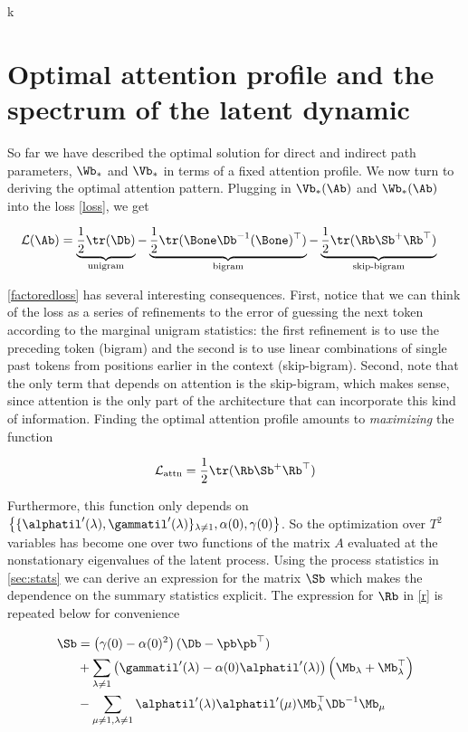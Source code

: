 k\documentclass{article}
\begin{document}
\section{Optimal attention profile and the spectrum of the latent dynamic}
So far we have described the optimal solution for direct and indirect path parameters, $\Wb_*$ and $\Vb_*$ in terms of a fixed attention profile. We now turn to deriving the optimal attention pattern. Plugging in $\Vb_*(\Ab)$ and $\Wb_*(\Ab)$ into the loss \eqref{loss}, we get 

\begin{align}\label{factoredloss}
    \mathcal{L}(\Ab) &= \underbrace{\frac{1}{2}\tr(\Db)}_{\text{unigram}} - \underbrace{\frac{1}{2}\tr(\Bone \Db^{-1}(\Bone)^\top)}_{\text{bigram}} - \underbrace{\frac{1}{2}\tr(\Rb \Sb^+\Rb^\top)}_{\text{skip-bigram}}
\end{align}

\eqref{factoredloss} has several interesting consequences. First, notice that we can think of the loss as a series of refinements to the error of guessing the next token according to the marginal unigram statistics: the first refinement is to use the preceding token (bigram) and the second is to use linear combinations of single past tokens from positions earlier in the context (skip-bigram). Second, note that the only term that depends on attention is the skip-bigram, which makes sense, since attention is the only part of the architecture that can incorporate this kind of information. Finding the optimal attention profile amounts to \textit{maximizing} the function 

\begin{equation}\label{lattn}
    \mathcal{L}_{\text{attn}} = \frac{1}{2}\tr(\Rb\Sb^+\Rb^\top)
\end{equation}

Furthermore, this function only depends on $\left\{\{\alphatil'(\lambda), \gammatil'(\lambda)\}_{\lambda\neq1}, \alpha(0), \gamma(0)\right\}$. So the optimization over $T^2$ variables has become one over two functions of the matrix $A$ evaluated at the nonstationary eigenvalues of the latent process. Using the process statistics in \ref{sec:stats} we can derive an expression for the matrix $\Sb$ which makes the dependence on the summary statistics explicit. The expression for $\Rb$ in \eqref{r} is repeated below for convenience

\begin{align}\label{s}
      \Sb &= \left(\gamma(0) - \alpha(0)^2\right)(\Db - \pb\pb^\top)\\
      &+ \sum_{\lambda \neq 1}\left( \gammatil'(\lambda) - \alpha(0)\alphatil'(\lambda)\right ) \left( \Mb_\lambda + \Mb_\lambda^\top\right) \\
      &- \sum_{\mu\neq 1, \lambda\neq 1} \alphatil'(\lambda)\alphatil'(\mu)\Mb_\lambda^\top \Db^{-1}\Mb_\mu
\end{align}
\end{document}
